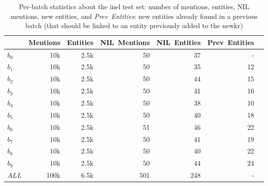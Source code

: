 \begin{table}[htbp]
    \centering
    \caption[Per-batch statistics about the \acs{inel} test set.]{Per-batch statistics about the \acs{inel} test set: number of mentions, entities, NIL mentions, new entities, and \emph{Prev~Entities}: new entities already found in a previous batch (that should be linked to an entity previously added to the \ac{newkr})}
    \label{tab:dataset_stats_extended}
\begin{tabular}{l|rrrrrr}
\toprule
{} &  \textbf{Mentions} &  \textbf{Entities} &  N\textbf{IL~Mentions}  &    \textbf{NIL~Entities} &  \textbf{Prev~Entities} \\
\midrule
$b_0$  &          10k &           2.5k &                 50 &                      37 &                                          - &                                          \\
$b_1$  &          10k &           2.5k &                 50 &                      35 &                                         12 &                                          \\
$b_2$  &          10k &           2.5k &                 50 &                      44 &                                         15 &                                          \\
$b_3$  &          10k &           2.5k &                 50 &                      41 &                                         16 &                                          \\
$b_4$  &          10k &           2.5k &                 50 &                      38 &                                         10 &                                          \\
$b_5$  &          10k &           2.5k &                 50 &                      40 &                                         18 &                                          \\
$b_6$  &          10k &           2.5k &                 51 &                      46 &                                         22 &                                          \\
$b_7$  &          10k &           2.5k &                 50 &                      41 &                                         19 &                                          \\
$b_8$  &          10k &           2.5k &                 50 &                      40 &                                         22 &                                          \\
$b_9$  &          10k &           2.5k &                 50 &                      44 &                                         24 &                                          \\
$ALL$ &         100k &           6.5k &                501 &                     248 &                                          - &                                          \\
\bottomrule
\end{tabular}
\end{table}

